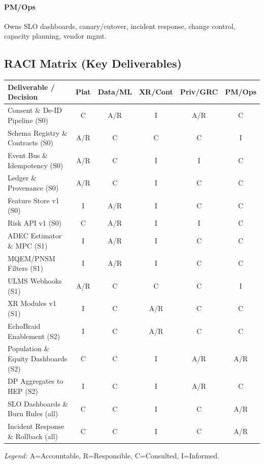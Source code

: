 \documentclass[11pt]{article}
\theoremstyle{plain}
\begin{document}
\paragraph{PM/Ops} Owns SLO dashboards, canary/cutover, incident response, change control, capacity planning, vendor mgmt.

\subsection{RACI Matrix (Key Deliverables)}
\begin{center}
\small
\begin{tabular}{l c c c c c}
\hline
\textbf{Deliverable / Decision} & \textbf{Plat} & \textbf{Data/ML} & \textbf{XR/Cont} & \textbf{Priv/GRC} & \textbf{PM/Ops} \\
\hline
Consent \& De-ID Pipeline (S0) & C & A/R & I & A/R & C \\
Schema Registry \& Contracts (S0) & A/R & C & C & C & I \\
Event Bus \& Idempotency (S0) & A/R & C & I & I & C \\
Ledger \& Provenance (S0) & A/R & C & I & C & C \\
Feature Store v1 (S0) & I & A/R & I & C & C \\
Risk API v1 (S0) & C & A/R & I & I & C \\
ADEC Estimator \& MPC (S1) & I & A/R & I & C & C \\
MQEM/PNSM Filters (S1) & I & A/R & I & C & C \\
ULMS Webhooks (S1) & A/R & C & C & C & I \\
XR Modules v1 (S1) & I & C & A/R & C & C \\
EchoBraid Enablement (S2) & I & C & A/R & C & C \\
Population \& Equity Dashboards (S2) & C & C & I & A/R & A/R \\
DP Aggregates to HEP (S2) & I & C & I & A/R & C \\
SLO Dashboards \& Burn Rules (all) & C & C & I & C & A/R \\
Incident Response \& Rollback (all) & C & C & I & C & A/R \\
\hline
\end{tabular}
\end{center}
\textit{Legend:} A=Accountable, R=Responsible, C=Consulted, I=Informed.
\end{document}
